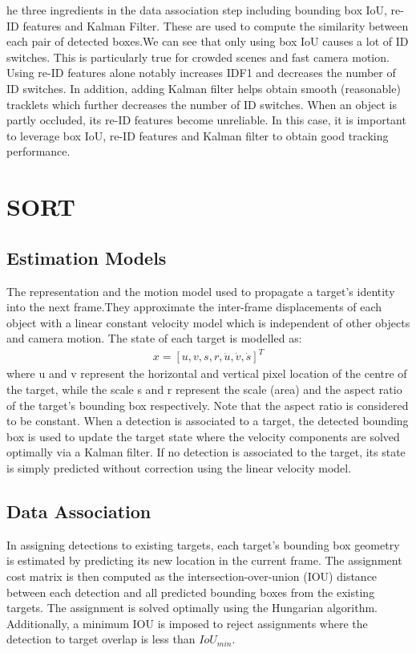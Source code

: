         \vspace{3mm}
        he three ingredients in the data association step including bounding box IoU, re-ID features and Kalman Filter. These are used to compute the similarity between each pair of detected boxes.We can see that only using box IoU causes a lot of ID switches. This is particularly 
        true for crowded scenes and fast camera motion. Using re-ID features alone notably increases IDF1 and decreases the number of ID switches. In addition, adding Kalman filter helps obtain smooth (reasonable) tracklets which further decreases the number of ID switches. 
        When an object is partly occluded, its re-ID features become unreliable. In this case, it is important to leverage box IoU, re-ID features and Kalman filter to obtain good tracking performance.

\section{SORT}
    \subsection{Estimation Models}
        The representation and the motion model used to propagate a target’s identity into the
        next frame.They approximate the inter-frame displacements of each object with a linear constant velocity model which is independent of other objects and camera motion. The state of
        each target is modelled as:
        \begin{align}
            x =[u,v,s,r,\dot{u},\dot{v},\dot{s}]^T
        \end{align}
        where u and v represent the horizontal and vertical pixel location of the centre of the target, while the scale s and r represent the scale (area) and the aspect ratio of the target’s bounding box respectively. Note that the aspect ratio is considered to be constant. 
        When a detection is associated to a target, the detected bounding box is used to update the target state where the velocity components are solved optimally via a Kalman filter. If no detection is associated to the target, its state is simply predicted without correction using 
        the linear velocity model.
    \subsection{Data Association}
        In assigning detections to existing targets, each target’s bounding box geometry is estimated by predicting its new location in the current frame. The assignment cost matrix is then computed as the intersection-over-union (IOU) distance between each detection and all predicted bounding boxes 
        from the existing targets. The assignment is solved optimally using the Hungarian algorithm. Additionally, a minimum IOU is imposed to reject assignments where the detection to target overlap is less than $IoU_{min}$.
